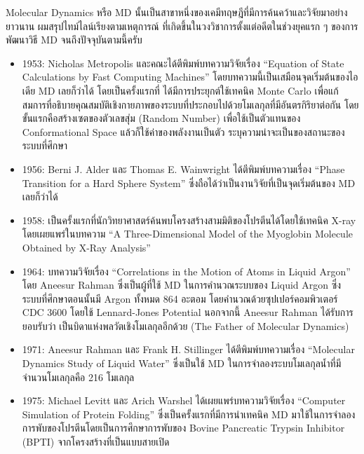 Molecular Dynamics หรือ MD นั้นเป็นสาขาหนึ่งของเคมีทฤษฎีที่มีการค้นคว้าและวิจัยมาอย่างยาวนาน ผมสรุปไทม์ไลน์เรียงตามเหตุการณ์%
ที่เกิดขึ้นในวงวิชาการตั้งแต่อดีตในช่วงยุคแรก ๆ ของการพัฒนาวิธี MD จนถึงปัจจุบันตามนี้ครับ

\begin{itemize}[topsep=0pt,noitemsep]
    \setlength\itemsep{0.5em}
    \item 1953: Nicholas Metropolis และคณะได้ตีพิมพ์บทความวิจัยเรื่อง \enquote{Equation of State Calculations by Fast
              Computing Machines}\autocite{metropolis1953} โดยบทความนี้เป็นเสมือนจุดเริ่มต้นของไอเดีย MD เลยก็ว่าได้ โดยเป็นครั้งแรกที่%
          ได้มีการประยุกต์ใช้เทคนิค Monte Carlo เพื่อแก้สมการที่อธิบายคุณสมบัติเชิงกายภาพของระบบที่ประกอบไปด้วยโมเลกุลที่มีอันตรกิริยาต่อกัน
          โดยขั้นแรกคือสร้างเซตของตัวเลขสุ่ม (Random Number) เพื่อใช้เป็นตัวแทนของ Conformational Space แล้วก็ใช้ค่าของพลังงานเป็นตัว%
          ระบุความน่าจะเป็นของสถานะของระบบที่ศึกษา

    \item 1956: Berni J. Alder และ Thomas E. Wainwright ได้ตีพิมพ์บทความเรื่อง \enquote{Phase Transition for a Hard
              Sphere System}\autocite{alder1957} ซึ่งถือได้ว่าเป็นงานวิจัยที่เป็นจุดเริ่มต้นของ MD เลยก็ว่าได้

    \item 1958: เป็นครั้งแรกที่นักวิทยาศาสตร์ค้นพบโครงสร้างสามมิติของโปรตีนได้โดยใช้เทคนิค X-ray โดยเผยแพร่ในบทความ
          \enquote{A Three-Dimensional Model of the Myoglobin Molecule Obtained by X-Ray Analysis}\autocite{kendrew1958}

    \item 1964: บทความวิจัยเรื่อง \enquote{Correlations in the Motion of Atoms in Liquid Argon}\autocite{rahman1964}
          โดย Aneesur Rahman ซึ่งเป็นผู้ที่ใช้ MD ในการคำนวณระบบของ Liquid Argon ซึ่งระบบที่ศึกษาตอนนั้นมี Argon ทั้งหมด 864 อะตอม
          โดยคำนวณด้วยซุปเปอร์คอมพิวเตอร์  CDC 3600 โดยใช้ Lennard-Jones Potential นอกจากนี้ Aneesur Rahman ได้รับการยอบรับว่า%
          เป็นบิดาแห่งพลวัตเชิงโมเลกุลอีกด้วย (The Father of Molecular Dynamics)

    \item 1971: Aneesur Rahman และ Frank H. Stillinger ได้ตีพิมพ์บทความเรื่อง \enquote{Molecular Dynamics Study of
              Liquid Water}\autocite{rahman1971} ซึ่งเป็นใช้ MD ในการจำลองระบบโมเลกุลน้ำที่มีจำนวนโมเลกุลคือ 216 โมเลกุล

    \item 1975: Michael Levitt และ Arich Warshel ได้เผยแพร่บทความวิจัยเรื่อง \enquote{Computer Simulation of Protein
              Folding}\autocite{levitt1975} ซึ่งเป็นครั้งแรกที่มีการนำเทคนิค MD มาใช้ในการจำลองการพับของโปรตีนโดยเป็นการศึกษาการพับของ
          Bovine Pancreatic Trypsin Inhibitor (BPTI) จากโครงสร้างที่เป็นแบบสายเปิด


\end{itemize}
